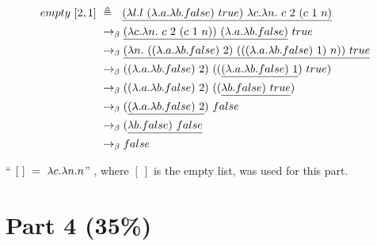 \documentclass{article}
\begin{document}
\begin{Large}
		\begin{align*}
			empty \ [2,1] \ &\triangleq \saq \underline{(\la l.l \ (\la .a.\la b.false) \ true) \ \la c.\la n. \ c \ 2 \ (c \ 1 \ n)} \\
			&\equals \underline{(\la c.\la n. \ c \ 2 \ (c \ 1 \ n)) \ (\la .a.\la b.false)} \ true \\
			&\equals \underline{(\la n. \ ((\la .a.\la b.false) \ 2) \ (((\la .a.\la b.false) \ 1) \ n)) \ true} \\
			&\equals ((\la .a.\la b.false) \ 2) \ ((\underline{(\la .a.\la b.false) \ 1}) \ true) \\
			&\equals ((\la .a.\la b.false) \ 2) \ ((\underline{\la b.false) \ true}) \\
			&\equals (\underline{(\la .a.\la b.false) \ 2}) \ false \\
			&\equals (\underline{\la b.false) \ false} \\
			&\equals false
		\end{align*}
		\newline
		
		``$ \ [ \ ] \ = \ \lambda c.\lambda n.n$'' , where $[ \ ]$ is the empty list, was used for this part.
		
	\end{Large}
	\newpage


	
	\section{Part 4 (35\%)}
\end{document}
